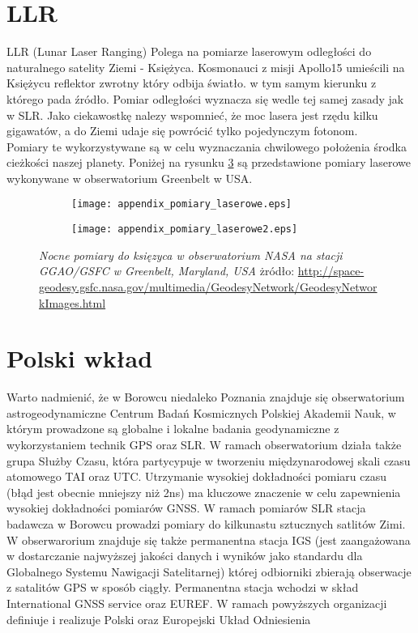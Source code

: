 \section{LLR}
\noindent LLR (Lunar Laser Ranging)
Polega na pomiarze laserowym odległości do naturalnego satelity Ziemi - Księżyca.
Kosmonauci z misji Apollo15 umieścili na Księżycu reflektor zwrotny który odbija światło.  
w tym samym kierunku z którego pada źródło. Pomiar odległości wyznacza się wedle tej samej zasady jak w SLR.
Jako ciekawostkę nalezy wspomnieć, że moc lasera jest rzędu kilku gigawatów, a do Ziemi udaje się powrócić 
tylko pojedynczym fotonom.\\
\indent Pomiary te wykorzystywane są w celu wyznaczania chwilowego położenia środka cieżkości naszej planety.
Poniżej na rysunku \ref{fig:LLR_both} są przedstawione pomiary laserowe wykonywane w obserwatorium Greenbelt w USA.
\begin{figure}[H]
\centering
\begin{subfigure}{.5\textwidth}
  \centering
  \texttt{[image: appendix\_pomiary\_laserowe.eps]}
  \caption{}
  \label{fig:LLR_sub1}
\end{subfigure}%
\begin{subfigure}{.5\textwidth}
  \centering
  \texttt{[image: appendix\_pomiary\_laserowe2.eps]}
  \caption{}
  \label{fig:LLR_sub2}
\end{subfigure}
\caption{\textit{Nocne pomiary do księzyca w obserwatorium NASA na stacji GGAO/GSFC w Greenbelt, Maryland, USA}
żródło: \protect\url{http://space-geodesy.gsfc.nasa.gov/multimedia/GeodesyNetwork/GeodesyNetworkImages.html}}
\label{fig:LLR_both}
\end{figure}

\section{Polski wkład}
\noindent Warto nadmienić, że w Borowcu niedaleko Poznania znajduje się obserwatorium astrogeodynamiczne Centrum Badań Kosmicznych Polskiej Akademii Nauk, 
w którym prowadzone są globalne i lokalne badania geodynamiczne z wykorzystaniem technik GPS oraz SLR.
W ramach obserwatorium działa także grupa Służby Czasu, która partycypuje w tworzeniu międzynarodowej skali czasu atomowego TAI oraz UTC.
Utrzymanie wysokiej dokładności pomiaru czasu (błąd jest obecnie mniejszy niż 2ns) ma kluczowe znaczenie w celu zapewnienia 
wysokiej dokładności pomiarów GNSS. \cite[][zakładka: infomrcje ogólne]{BOROWIEC}
\indent W ramach pomiarów SLR stacja badawcza w Borowcu prowadzi pomiary do kilkunastu sztucznych satlitów Zimi. 
W obserwarorium znajduje się także permanentna stacja IGS (jest zaangażowana w dostarczanie najwyższej jakości danych i wyników jako standardu dla Globalnego Systemu Nawigacji Satelitarnej) której odbiorniki zbierają obserwacje z satalitów GPS w sposób ciągły.
Permanentna stacja wchodzi w skład International GNSS service oraz EUREF. W ramach powyższych organizacji definiuje i realizuje Polski oraz Europejski Układ Odniesienia
\cite[][zakładka: Stacja IGS]{BOROWIEC}
 
